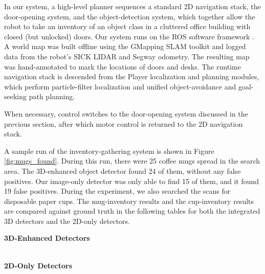 \documentclass[letterpaper, 10 pt, conference]{ieeeconf}  %
\begin{document}
In our system, a high-level planner sequences a standard 2D navigation stack,
the door-opening system, and the object-detection system, which together allow
the robot to take an inventory of an object class in a cluttered office
building with closed (but unlocked) doors. Our system runs on the ROS software
framework \cite{bib:ros}. A world map was built offline using the GMapping SLAM
toolkit \cite{bib:gmapping} and logged data from the robot's SICK LIDAR and
Segway odometry. The resulting map was hand-annotated to mark the locations of 
doors and desks. The runtime navigation stack is descended from the Player
localization and planning modules, which perform particle-filter localization
and unified object-avoidance and goal-seeking path planning. 

When necessary, control switches to the door-opening system discussed in the
previous section, after which motor control is returned to the 2D navigation
stack.

A sample run of the inventory-gathering system is shown in Figure
\ref{fig:mugs_found}. During this run, there were 25 coffee mugs spread in the
search area. The 3D-enhanced object detector found 24 of them, without any
false positives. Our image-only detector was only able to find 15 of them, and
it found 19 false positives. During the experiment, we also searched the scans
for disposable paper cups. The mug-inventory results and the cup-inventory
results are compared against ground truth in the following tables for both
the integrated 3D detectors and the 2D-only detectors.

\begin{centering}
{\bf{3D-Enhanced Detectors}} \\ \smallskip
{} \\
\end{centering}

\bigskip
\begin{centering}
{\bf{2D-Only Detectors}} \\ \smallskip
{} \\
\end{centering}
\end{document}
